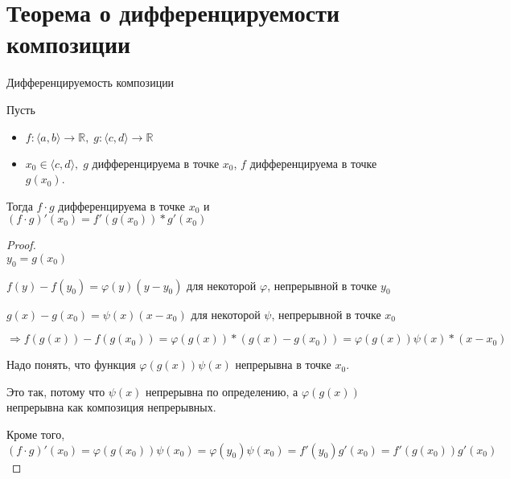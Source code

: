 \section{Теорема о дифференцируемости композиции}
\begin{theorem-non} 
    Дифференцируемость композиции

    Пусть 
    \begin{itemize}
        \item $f: \langle a, b \rangle \to \mathbb{R}, \; g: \langle c, d \rangle \to \mathbb{R}$
        \item $x_0 \in \langle c, d \rangle, \; g$ дифференцируема в точке $x_0$, $f$ дифференцируема в точке $g(x_0)$.
    \end{itemize}

    Тогда $f \cdot g$ дифференцируема в точке $x_0$ и $(f \cdot g)'(x_0) = f'(g(x_0)) * g'(x_0)$
\end{theorem-non}
\begin{proof} \quad \\
    $y_0 = g(x_0)$

    $f(y) - f(y_0) = \varphi(y)(y - y_0)$ для некоторой $\varphi$, непрерывной в точке $y_0$

    $g(x) - g(x_0) = \psi(x)(x - x_0)$ для некоторой $\psi$, непрерывной в точке $x_0$

    $\Rightarrow f(g(x)) - f(g(x_0)) = \varphi(g(x)) * (g(x) - g(x_0)) = \varphi(g(x))\psi(x) * (x - x_0)$

    Надо понять, что функция $\varphi(g(x))\psi(x)$ непрерывна в точке $x_0$.

    Это так, потому что $\psi(x)$ непрерывна по определению, а $\varphi(g(x))$ непрерывна как композиция непрерывных.

    Кроме того, $(f \cdot g)'(x_0) = \varphi(g(x_0))\psi(x_0) = \varphi(y_0)\psi(x_0) = f'(y_0)g'(x_0) = f'(g(x_0))g'(x_0)$
\end{proof}
